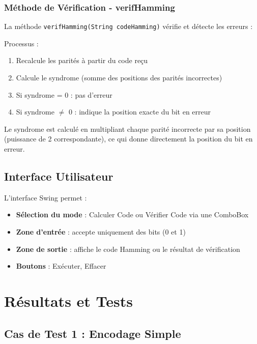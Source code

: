 \documentclass[12pt, a4paper]{article}
\begin{document}
\subsubsection{Méthode de Vérification - verifHamming}

La méthode \texttt{verifHamming(String codeHamming)} vérifie et détecte les erreurs :



Processus :
\begin{enumerate}
    \item Recalcule les parités à partir du code reçu
    \item Calcule le syndrome (somme des positions des parités incorrectes)
    \item Si syndrome = 0 : pas d'erreur
    \item Si syndrome $\neq$ 0 : indique la position exacte du bit en erreur
\end{enumerate}

Le syndrome est calculé en multipliant chaque parité incorrecte par sa position (puissance de 2 correspondante), ce qui donne directement la position du bit en erreur.

\subsection{Interface Utilisateur}

L'interface Swing permet :

\begin{itemize}
    \item \textbf{Sélection du mode} : Calculer Code ou Vérifier Code via une ComboBox
    \item \textbf{Zone d'entrée} : accepte uniquement des bits (0 et 1)
    \item \textbf{Zone de sortie} : affiche le code Hamming ou le résultat de vérification
    \item \textbf{Boutons} : Exécuter, Effacer
\end{itemize}

\section{Résultats et Tests}

\subsection{Cas de Test 1 : Encodage Simple}
\end{document}
